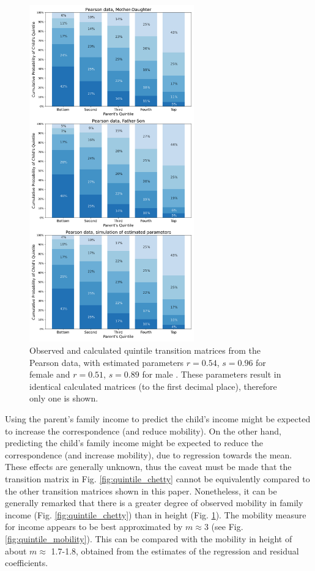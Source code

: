 \documentclass{svproc} %
\begin{document}
\begin{figure}[H]
\centering
\includegraphics[width=2.8in]{figures/quintile-pearson.png} 
\caption{Observed and calculated quintile transition matrices from the Pearson data, with estimated parameters $r = 0.54$, $s = 0.96$ for female and $r = 0.51$, $s = 0.89$ for male \cite{pearson}. These parameters result in identical calculated matrices (to the first decimal place), therefore only one is shown.}
\label{fig:quintile_pearson}
\end{figure}

Using the parent's family income to predict the child's income might be expected to increase the correspondence (and reduce mobility). On the other hand, predicting the child's family income might be expected to reduce the correspondence (and increase mobility), due to regression towards the mean. These effects are generally unknown, thus the caveat must be made that the transition matrix in Fig. \ref{fig:quintile_chetty} cannot be equivalently compared to the other transition matrices shown in this paper. Nonetheless, it can be generally remarked that there is a greater degree of observed mobility in family income (Fig. \ref{fig:quintile_chetty}) than in height (Fig. \ref{fig:quintile_pearson}). The mobility measure for income appears to be best approximated by $m \approx 3$ (see Fig. \ref{fig:quintile_mobility}). This can be compared with the mobility in height of about $m \approx$ 1.7-1.8, obtained from the estimates of the regression and residual coefficients.
\end{document}
